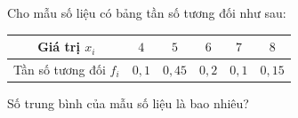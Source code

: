 \begin{ex}
Cho mẫu số liệu có bảng tần số tương đối như sau:
\begin{center}
\begin{tabular}{|c|c|c|c|c|c|}\hline
Giá trị $x_i$ & $4$ & $5$ & $6$ & $7$ & $8$\\\hline
Tần số tương đối $f_i$ & $0{,}1$ & $0{,}45$ & $0{,}2$ & $0{,}1$ & $0{,}15$\\\hline
\end{tabular}
\end{center}
Số trung bình của mẫu số liệu là bao nhiêu?
\end{ex}
